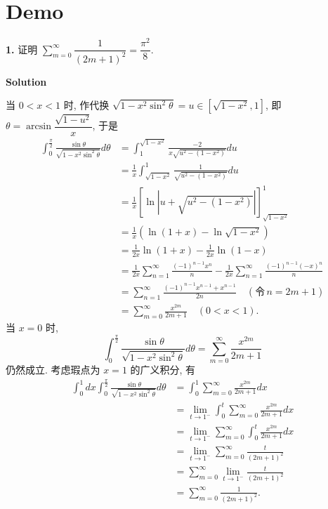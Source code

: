 \documentclass[11pt,a4paper,openany,oneside]{book}
\newcommand\Solution{\noindent\textbf{\textsf{Solution}}\par\medskip}
\begin{document}
\section{Demo}



\begin{myexample}
\textbf{1.} 
证明 $\sum\limits_{m=0}^{\infty}\dfrac{1}{(2m+1)^2}=\dfrac{\pi^2}{8}$.
\end{myexample}

\Solution


当 $0<x<1$ 时, 作代换 $\sqrt{1-x^2 \sin ^2\theta }=u\in[\sqrt{1-x^2},1]$, 即 $\theta=\arcsin\dfrac{\sqrt{1-u^2}}{x}$, 于是
\begin{align*}
\int_{0}^{\frac{\pi}{2}}\frac{\sin\theta }{\sqrt{1-x^2 \sin ^2\theta }}d\theta&=\int_{1}^{\sqrt{1-x^2}}\frac{-2}{x\sqrt{u^2-(1-x^2)}}du\\
&=\frac{1}{x}\int_{\sqrt{1-x^2}}^{1}\frac{1}{\sqrt{u^2-(1-x^2)}}du\\
&=\frac{1}{x}\left[\ln\left|u+\sqrt{u^2-(1-x^2)}\right|\right]_{\sqrt{1-x^2}}^{1}\\
&=\frac{1}{x}\left(\ln(1+x)-\ln\sqrt{1-x^2}\right)\\
&=\frac{1}{2x}\ln(1+x)-\frac{1}{2x}\ln(1-x)\\
&=\frac{1}{2x}\sum_{n=1}^{\infty}\frac{(-1)^{n-1}x^{n}}{n}-\frac{1}{2x}\sum_{n=1}^{\infty}\frac{(-1)^{n-1}(-x)^{n}}{n}\\
&=\sum_{n=1}^{\infty}\frac{(-1)^{n-1}x^{n-1}+x^{n-1}}{2n}\quad(\text{令}\,n=2m+1)\\
&=\sum_{m=0}^{\infty}\frac{x^{2m}}{2m+1}\quad(0<x<1).
\end{align*}
当 $x=0$ 时, 
\[
\int_{0}^{\frac{\pi}{2}}\frac{\sin\theta }{\sqrt{1-x^2 \sin ^2\theta }}d\theta=\sum_{m=0}^{\infty}\frac{x^{2m}}{2m+1}
\]
仍然成立.
考虑瑕点为 $x=1$ 的广义积分, 有
\begin{align}
\int_{0}^{1}dx\int_{0}^{\frac{\pi}{2}}\frac{\sin\theta }{\sqrt{1-x^2 \sin ^2\theta }}d\theta&=\int_{0}^{1}\sum_{m=0}^{\infty}\frac{x^{2m}}{2m+1} dx\\
&=\lim_{t\to 1^-}\int_{0}^{t}\sum_{m=0}^{\infty}\frac{x^{2m}}{2m+1} dx\\
&=\lim_{t\to 1^-}\sum_{m=0}^{\infty}\int_{0}^{t}\frac{x^{2m}}{2m+1} dx\\
&=\lim_{t\to 1^-}\sum_{m=0}^{\infty}\frac{t}{(2m+1)^2} \\
&=\sum_{m=0}^{\infty}\lim_{t\to 1^-}\frac{t}{(2m+1)^2} \\
&=\sum_{m=0}^{\infty}\frac{1}{(2m+1)^2}.
\end{align}
\end{document}
